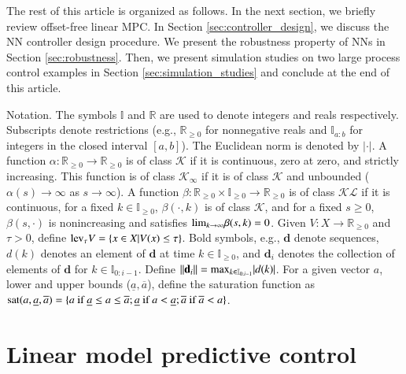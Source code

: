 \documentclass[preprint,5p, twocolumn, authoryear]{elsarticle}
\newcommand{\bbR}{\mathbb{R}}
\newcommand{\bbI}{\mathbb{I}}
\begin{document}
The rest of this article is organized as follows. 
In the next section, we briefly review 
offset-free linear MPC. 
In Section \ref{sec:controller_design},
we discuss the NN 
controller design procedure.
We present the robustness property
of NNs in Section \ref{sec:robustness}.
Then, we present simulation studies
on two large process control examples
in Section \ref{sec:simulation_studies}
and conclude at the end of this article.

Notation. The symbols $\bbI$ and $\bbR$ are 
used to denote integers and reals respectively. 
Subscripts denote restrictions 
(e.g., $\bbR_{\geq 0}$ for nonnegative reals and 
$\bbI_{a:b}$ for integers in the 
closed interval $[a, b]$). The Euclidean norm 
is denoted by $\vert \cdot \vert$. A function 
$\alpha : \bbR_{\geq 0} \rightarrow \bbR_{\geq 0}$
is of class $\mathcal{K}$ if it is continuous, zero 
at zero, and strictly increasing. This function is of class 
$\mathcal{K}_{\infty}$ if it is of class $\mathcal{K}$
and unbounded ($\alpha(s) \rightarrow \infty$ as 
$s \rightarrow \infty$). A function
$\beta : \bbR_{\geq 0} \times \bbI_{\geq 0} \rightarrow \bbR_{\geq 0}$
is of class $\mathcal{K} \mathcal{L}$ if it is continuous,
for a fixed $k \in \bbI_{\geq 0}$, $\beta(\cdot, k)$ is of class $\mathcal{K}$,
and for a fixed $s \geq 0$, $\beta(s, \cdot)$ is nonincreasing
and satisfies $\textnormal{lim}_{k \rightarrow \infty} \beta(s, k) = 0$.
Given $V : X \rightarrow \bbR_{\geq 0}$ and $\tau > 0$, define 
$\textnormal{lev}_{\tau} V = \{ x \in X | V(x) \leq \tau \}$.
Bold symbols, e.g., $\mathbf{d}$ denote sequences, 
$d(k)$ denotes an element of $\mathbf{d}$ at time 
$k \in \bbI_{\geq 0}$, and $\mathbf{d}_i$ 
denotes the collection of elements of 
$\mathbf{d}$ for $k \in \bbI_{0:i-1}$.
Define $\vert \vert \mathbf{d}_i \vert \vert = 
\textnormal{max}_{k \in \bbI_{0:i-1}} \vert d(k) \vert$.
For a given vector $a$, lower and upper bounds 
($\underline{a}, \overline{a}$), define the saturation function 
as $\textnormal{sat}(a, \underline{a}, \overline{a}) = 
\{ a \ \textnormal{if} \ \underline{a} \leq a \leq \overline{a}; 
\underline{a} \ \textnormal{if} \ a < \underline{a};
\overline{a} \ \textnormal{if} \ \overline{a} < a \}$.

\section{Linear model predictive control} \label{sec:mpc}
\end{document}
